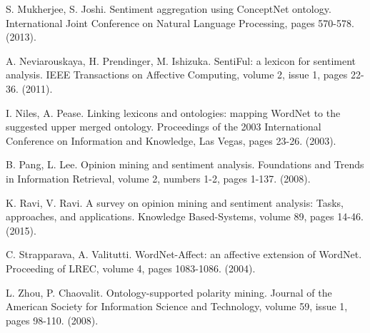 \documentclass[letterpaper, 10 pt, conference]{ieeeconf}
\begin{document}
\begin{thebibliography}{99}
 S. Mukherjee, S. Joshi. Sentiment aggregation using ConceptNet ontology. International Joint Conference on Natural Language Processing, pages 570-578. (2013).

 A. Neviarouskaya, H. Prendinger, M. Ishizuka. SentiFul: a lexicon for sentiment analysis. IEEE Transactions on Affective Computing, volume 2, issue 1, pages 22-36. (2011).

 I. Niles, A. Pease. Linking lexicons and ontologies: mapping WordNet to the suggested upper merged ontology. Proceedings of the 2003 International Conference on Information and Knowledge, Las Vegas, pages 23-26. (2003).

 B. Pang, L. Lee. Opinion mining and sentiment analysis. Foundations and Trends in Information Retrieval, volume 2, numbers 1-2, pages 1-137. (2008).

 K. Ravi, V. Ravi. A survey on opinion mining and sentiment analysis: Tasks, approaches, and applications. Knowledge Based-Systems, volume 89, pages 14-46. (2015).

 C. Strapparava, A. Valitutti. WordNet-Affect: an affective extension of WordNet. Proceeding of LREC, volume 4, pages 1083-1086. (2004).

 L. Zhou, P. Chaovalit. Ontology-supported polarity mining. Journal of the American Society for Information Science and Technology, volume 59, issue 1, pages 98-110. (2008).

\end{thebibliography}
\end{document}
